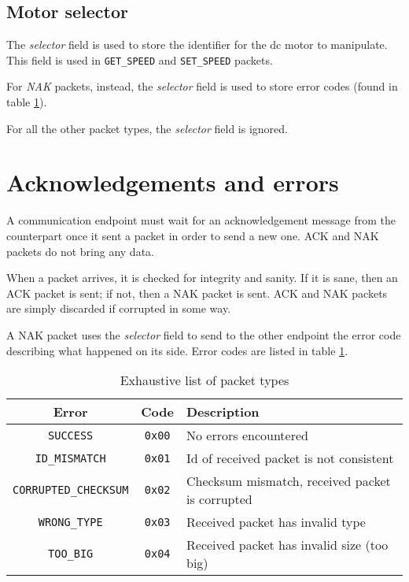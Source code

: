 \subsection{Motor selector}
The \emph{selector} field is used to store the identifier for the dc motor to
manipulate. This field is used in \texttt{GET\_SPEED} and \texttt{SET\_SPEED} packets.

For \emph{NAK} packets, instead, the \emph{selector} field is used to store
error codes (found in table \ref{tab:packet-error-codes}).

For all the other packet types, the \emph{selector} field is ignored.

\section{Acknowledgements and errors}
\label{client-master-comm-ackerr}
A communication endpoint must wait for an acknowledgement message from the
counterpart once it sent a packet in order to send a new one. ACK and NAK
packets do not bring any data.

When a packet arrives, it is checked for integrity and sanity. If it is sane,
then an ACK packet is sent; if not, then a NAK packet is sent.
ACK and NAK packets are simply discarded if corrupted in some way.

A NAK packet uses the \emph{selector} field to send to the other endpoint the
error code describing what happened on its side. Error codes are listed in
table \ref{tab:packet-error-codes}.

\begin{table}[bh]
  \begin{tabularx}{\textwidth}{c c X}
    \toprule
    Error & Code & Description \\
    \midrule
    \texttt{SUCCESS}             & \texttt{0x00} & No errors encountered \\
    \texttt{ID\_MISMATCH}        & \texttt{0x01} & Id of received packet is not consistent \\
    \texttt{CORRUPTED\_CHECKSUM} & \texttt{0x02} & Checksum mismatch, received packet is corrupted \\
    \texttt{WRONG\_TYPE}         & \texttt{0x03} & Received packet has invalid type \\
    \texttt{TOO\_BIG}            & \texttt{0x04} & Received packet has invalid size (too big) \\
    \bottomrule
  \end{tabularx}
  \caption{Exhaustive list of packet types}
  \label{tab:packet-error-codes}
\end{table}
